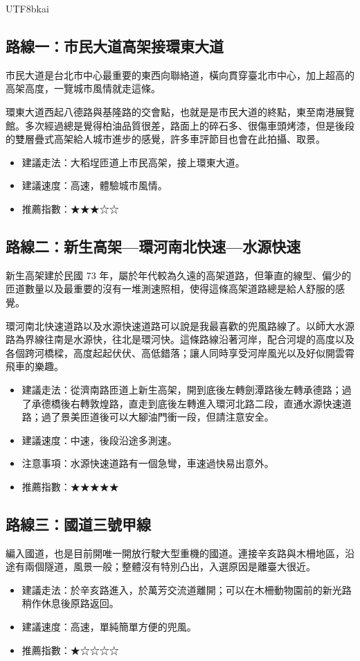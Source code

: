 \documentclass[a4paper, 12pt, oneside]{article}
\begin{document}
\begin{CJK}{UTF8}{bkai}
\subsection*{路線一：市民大道高架接環東大道}
市民大道是台北市中心最重要的東西向聯絡道，橫向貫穿臺北市中心，加上超高的高架高度，一覽城市風情就走這條。

環東大道西起八德路與基隆路的交會點，也就是是市民大道的終點，東至南港展覽館。多次經過總是覺得柏油品質很差，路面上的碎石多、很傷車頭烤漆，但是後段的雙層疊式高架給人城市進步的感覺，許多車評節目也會在此拍攝、取景。
\begin{itemize}
	\item 建議走法：大稻埕匝道上市民高架，接上環東大道。
	\item 建議速度：高速，體驗城市風情。
	\item 推薦指數：★★★☆☆
\end{itemize}
\subsection*{路線二：新生高架—環河南北快速—水源快速}
新生高架建於民國 73 年，屬於年代較為久遠的高架道路，但筆直的線型、偏少的匝道數量以及最重要的沒有一堆測速照相，使得這條高架道路總是給人舒服的感覺。

環河南北快速道路以及水源快速道路可以說是我最喜歡的兜風路線了。以師大水源路為界線往南是水源快，往北是環河快。這條路線沿著河岸，配合河堤的高度以及各個跨河橋樑，高度起起伏伏、高低錯落；讓人同時享受河岸風光以及好似開雲霄飛車的樂趣。
\begin{itemize}
	\item 建議走法：從濟南路匝道上新生高架，開到底後左轉劍潭路後左轉承德路；過了承德橋後右轉敦煌路，直走到底後左轉進入環河北路二段，直通水源快速道路；過了景美匝道後可以大腳油門衝一段，但請注意安全。
	\item 建議速度：中速，後段沿途多測速。
	\item 注意事項：水源快速道路有一個急彎，車速過快易出意外。
	\item 推薦指數：★★★★★
\end{itemize}
\subsection*{路線三：國道三號甲線}
編入國道，也是目前開唯一開放行駛大型重機的國道。連接辛亥路與木柵地區，沿途有兩個隧道，風景一般；整體沒有特別凸出，入選原因是離臺大很近。
\begin{itemize}
	\item 建議走法：於辛亥路進入，於萬芳交流道離開；可以在木柵動物園前的新光路稍作休息後原路返回。
	\item 建議速度：高速，單純簡單方便的兜風。
	\item 推薦指數：★☆☆☆☆
\end{itemize}

\end{CJK}
\end{document}
